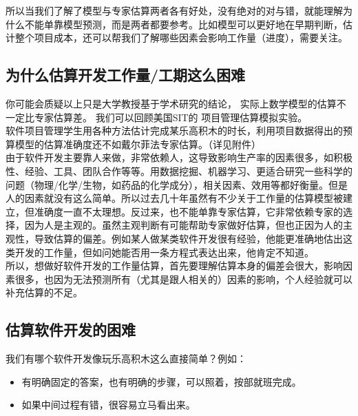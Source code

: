 所以当我们了解了模型与专家估算两者各有好处，没有绝对的对与错，就能理解为什么不能单靠模型预测，而是两者都要参考。比如模型可以更好地在早期判断，估计整个项目成本，还可以帮我们了解哪些因素会影响工作量（进度），需要关注。\\

\hypertarget{ux4e3aux4ec0ux4e48ux4f30ux7b97ux5f00ux53d1ux5de5ux4f5cux91cfux5de5ux671fux8fd9ux4e48ux56f0ux96be}{%
\subsection{为什么估算开发工作量/工期这么困难}\label{ux4e3aux4ec0ux4e48ux4f30ux7b97ux5f00ux53d1ux5de5ux4f5cux91cfux5de5ux671fux8fd9ux4e48ux56f0ux96be}}

你可能会质疑以上只是大学教授基于学术研究的结论，
实际上数学模型的估算不一定比专家估算差。 我们可以回顾美国SIT的
项目管理估算模拟实验。\\
软件项目管理学生用各种方法估计完成某乐高积木的时长，利用项目数据得出的预算模型的估算准确度还不如戴尔菲法专家估算。（详见附件）\\
由于软件开发主要靠人来做，非常依赖人，这导致影响生产率的因素很多，如积极性、经验、工具、团队合作等等。用数据挖掘、机器学习、更适合研究一些科学的问题（物理/化学/生物，如药品的化学成分），相关因素、效用等都好衡量。但是人的因素就没有这么简单。所以过去几十年虽然有不少关于工作量的估算模型被建立，但准确度一直不太理想。反过来，也不能单靠专家估算，它非常依赖专家的选择，因为人是主观的。虽然主观判断有可能帮助专家做好估算，但也正因为人的主观性，导致估算的偏差。例如某人做某类软件开发很有经验，他能更准确地估出这类开发的工作量，但如问她能否用一条方程式表达出来，他肯定不知道。\\
所以，想做好软件开发的工作量估算，首先要理解估算本身的偏差会很大，影响因素很多，也因为无法预测所有（尤其是跟人相关的）因素的影响，个人经验就可以补充估算的不足。\\

\hypertarget{ux4f30ux7b97ux8f6fux4ef6ux5f00ux53d1ux7684ux56f0ux96be}{%
\subsection{估算软件开发的困难}\label{ux4f30ux7b97ux8f6fux4ef6ux5f00ux53d1ux7684ux56f0ux96be}}

我们有哪个软件开发像玩乐高积木这么直接简单？例如：

\begin{itemize}
\tightlist
\item
  有明确固定的答案，也有明确的步骤，可以照着，按部就班完成。
\item
  如果中间过程有错，很容易立马看出来。
\end{itemize}

